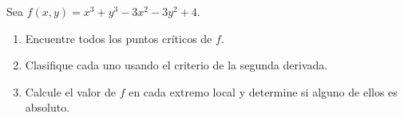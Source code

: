 Sea $f(x, y) = x^3 + y^3 - 3x^2 - 3y^2 + 4$.
\begin{enumerate}
    \item Encuentre todos los puntos críticos de $f$.
    \item Clasifique cada uno usando el criterio de la segunda derivada.
    \item Calcule el valor de $f$ en cada extremo local y determine si alguno de ellos es absoluto.
\end{enumerate}
